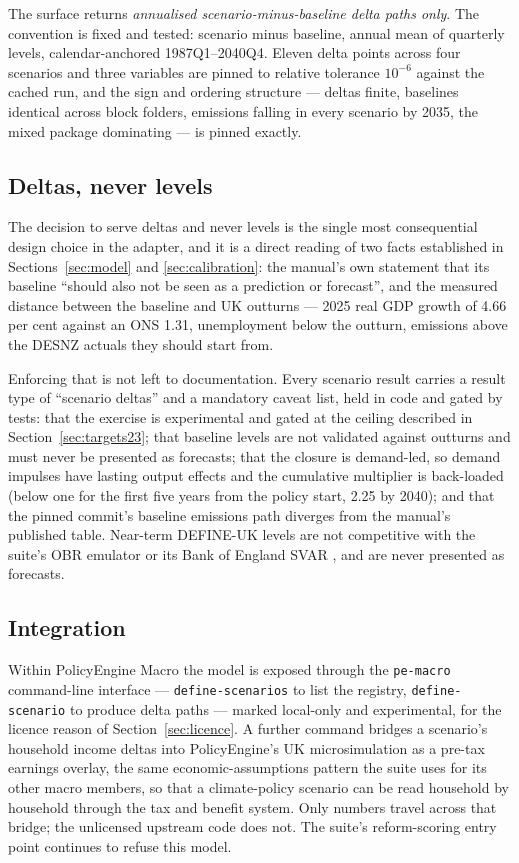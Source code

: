 The surface returns \emph{annualised scenario-minus-baseline delta paths only}. The convention is fixed and tested: scenario minus baseline, annual mean of quarterly levels, calendar-anchored 1987Q1--2040Q4. Eleven delta points across four scenarios and three variables are pinned to relative tolerance $10^{-6}$ against the cached run, and the sign and ordering structure --- deltas finite, baselines identical across block folders, emissions falling in every scenario by 2035, the mixed package dominating --- is pinned exactly.

\subsection{Deltas, never levels}
\label{sec:deltas}

The decision to serve deltas and never levels is the single most consequential design choice in the adapter, and it is a direct reading of two facts established in Sections~\ref{sec:model} and \ref{sec:calibration}: the manual's own statement that its baseline ``should also not be seen as a prediction or forecast'', and the measured distance between the baseline and UK outturns --- 2025 real GDP growth of 4.66 per cent against an ONS 1.31, unemployment below the outturn, emissions above the DESNZ actuals they should start from.

Enforcing that is not left to documentation. Every scenario result carries a result type of ``scenario deltas'' and a mandatory caveat list, held in code and gated by tests: that the exercise is experimental and gated at the ceiling described in Section~\ref{sec:targets23}; that baseline levels are not validated against outturns and must never be presented as forecasts; that the closure is demand-led, so demand impulses have lasting output effects and the cumulative multiplier is back-loaded (below one for the first five years from the policy start, 2.25 by 2040); and that the pinned commit's baseline emissions path diverges from the manual's published table. Near-term DEFINE-UK levels are not competitive with the suite's OBR emulator \citep{ahmadi2026obr} or its Bank of England SVAR \citep{ahmadi2026boesvar}, and are never presented as forecasts.

\subsection{Integration}

Within PolicyEngine Macro the model is exposed through the \texttt{pe-macro} command-line interface --- \texttt{define-scenarios} to list the registry, \texttt{define-scenario} to produce delta paths --- marked local-only and experimental, for the licence reason of Section~\ref{sec:licence}. A further command bridges a scenario's household income deltas into PolicyEngine's UK microsimulation as a pre-tax earnings overlay, the same economic-assumptions pattern the suite uses for its other macro members, so that a climate-policy scenario can be read household by household through the tax and benefit system. Only numbers travel across that bridge; the unlicensed upstream code does not. The suite's reform-scoring entry point continues to refuse this model.

